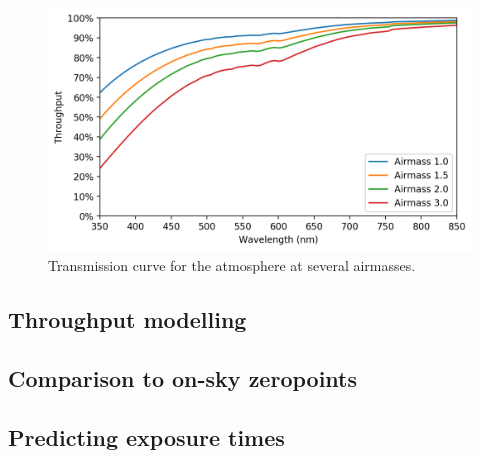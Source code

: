 \begin{colsection}
\begin{colsection}
\begin{figure}[t]
    \begin{center}
        \includegraphics[width=\textwidth]{images/throughput/trans_atm.png}
    \end{center}
    \caption[Atmospheric transmission curve]{
        Transmission curve for the atmosphere at several airmasses.
    }\label{fig:trans_atm}
\end{figure}

\end{colsection}

\newpage
\subsection{Throughput modelling}
\label{sec:synphot}
\begin{colsection}


\end{colsection}

\newpage
\subsection{Comparison to on-sky zeropoints}
\label{sec:onsky_throughput}
\begin{colsection}


\end{colsection}


\newpage
\subsection{Predicting exposure times}
\label{sec:etc}
\begin{colsection}


\end{colsection}


\end{colsection}

